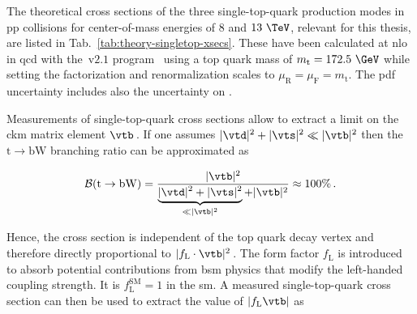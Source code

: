 The theoretical cross sections of the three single-top-quark production modes in pp collisions for center-of-mass energies of $8$ and $13~\TeV$, relevant for this thesis, are listed in Tab.~\ref{tab:theory-singletop-xsecs}. These have been calculated at \gls{nlo} in \gls{qcd} with the \HATHOR{}\,v$2.1$ program~\cite{Aliev:2010zk,Kant:2014oha} using a top quark mass of $m_\mathrm{t}=172.5~\GeV$ while setting the factorization and renormalization scales to $\mu_\mathrm{R}=\mu_\mathrm{F}=m_\mathrm{t}$. The \gls{pdf} uncertainty includes also the uncertainty on \as.


Measurements of single-top-quark cross sections allow to extract a limit on the \gls{ckm} matrix element $\vtb$\,. If one assumes $|\vtd|^2+|\vts|^2\ll|\vtb|^2$ then the $\mathrm{t}\to\mathrm{bW}$ branching ratio can be approximated as

\begin{equation}
\mathcal{B}(\mathrm{t}\to\mathrm{bW})=\frac{|\vtb|^2}{\underbrace{|\vtd|^2+|\vts|^2}_{\ll|\vtb|^2}+|\vtb|^2}\approx 100\%\,.
\end{equation}

Hence, the cross section is independent of the top quark decay vertex and therefore directly proportional to $|f_\mathrm{L}\cdot\vtb|^2$\,. The form factor $f_\mathrm{L}$ is introduced to absorb potential contributions from \gls{bsm} physics that modify the left-handed coupling strength. It is $f_\mathrm{L}^\mathrm{SM}=1$ in the \gls{sm}. A measured single-top-quark cross section can then be used to extract the value of $|f_\mathrm{L}\vtb|$ as

